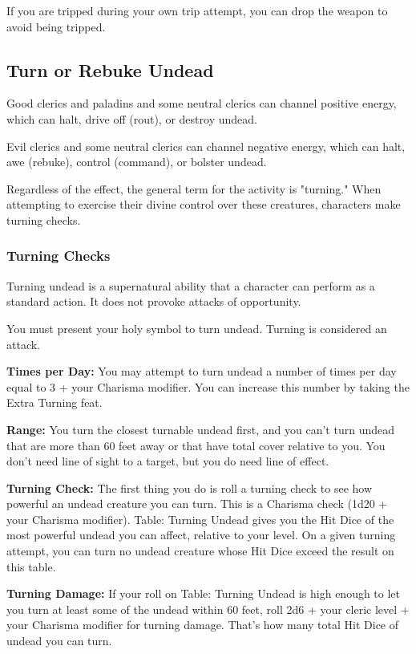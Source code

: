 If you are tripped during your own trip attempt, you can drop the weapon to avoid 
being tripped.

\subsection{Turn or Rebuke Undead}

Good clerics and paladins and some neutral clerics can channel positive energy, 
which can halt, drive off (rout), or destroy undead.

Evil clerics and some neutral clerics can channel negative energy, which can halt, 
awe (rebuke), control (command), or bolster undead.

Regardless of the effect, the general term for the activity is "turning." When 
attempting to exercise their divine control over these creatures, characters make 
turning checks.

\subsubsection{Turning Checks}

Turning undead is a supernatural ability that a character can perform as a standard 
action. It does not provoke attacks of opportunity.

You must present your holy symbol to turn undead. Turning is considered an attack.

\textbf{Times per Day:} You may attempt to turn undead a number of times per day 
equal to 3 + your Charisma modifier. You can increase this number by taking the 
Extra Turning feat.

\textbf{Range:} You turn the closest turnable undead first, and you can't turn 
undead that are more than 60 feet away or that have total cover relative to you. 
You don't need line of sight to a target, but you do need line of effect.

\textbf{Turning Check:} The first thing you do is roll a turning check to see how 
powerful an undead creature you can turn. This is a Charisma check (1d20 + your 
Charisma modifier). Table: Turning Undead gives you the Hit Dice of the most powerful 
undead you can affect, relative to your level. On a given turning attempt, you 
can turn no undead creature whose Hit Dice exceed the result on this table.

\textbf{Turning Damage:} If your roll on Table: Turning Undead is high enough to 
let you turn at least some of the undead within 60 feet, roll 2d6 + your cleric 
level + your Charisma modifier for turning damage. That's how many total Hit Dice 
of undead you can turn.

